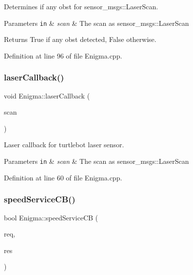 Determines if any obst for sensor\+\_\+msgs\+::\+Laser\+Scan. 


\begin{DoxyParams}[1]{Parameters}
\mbox{\tt in}  & {\em scan} & The scan as sensor\+\_\+msgs\+::\+Laser\+Scan\\
\hline
\end{DoxyParams}
\begin{DoxyReturn}{Returns}
True if any obst detected, False otherwise. 
\end{DoxyReturn}


Definition at line 96 of file Enigma.\+cpp.

\mbox{\label{class_enigma_a4b60ea0e93d9076e83d75ff3cfbe6fc3}} 
\subsubsection{\texorpdfstring{laser\+Callback()}{laserCallback()}}
{\footnotesize\ttfamily void Enigma\+::laser\+Callback (\begin{DoxyParamCaption}\item[{const sensor\+\_\+msgs\+::\+Laser\+Scan \&}]{scan }\end{DoxyParamCaption})}



Laser callback for turtlebot laser sensor. 


\begin{DoxyParams}[1]{Parameters}
\mbox{\tt in}  & {\em scan} & The scan as sensor\+\_\+msgs\+::\+Laser\+Scan \\
\hline
\end{DoxyParams}


Definition at line 60 of file Enigma.\+cpp.

\mbox{\label{class_enigma_acc1fde6fec011f3f51a5198713262d22}} 
\subsubsection{\texorpdfstring{speed\+Service\+C\+B()}{speedServiceCB()}}
{\footnotesize\ttfamily bool Enigma\+::speed\+Service\+CB (\begin{DoxyParamCaption}\item[{enigma\+::change\+Speed\+::\+Request \&}]{req,  }\item[{enigma\+::change\+Speed\+::\+Response \&}]{res }\end{DoxyParamCaption})}



